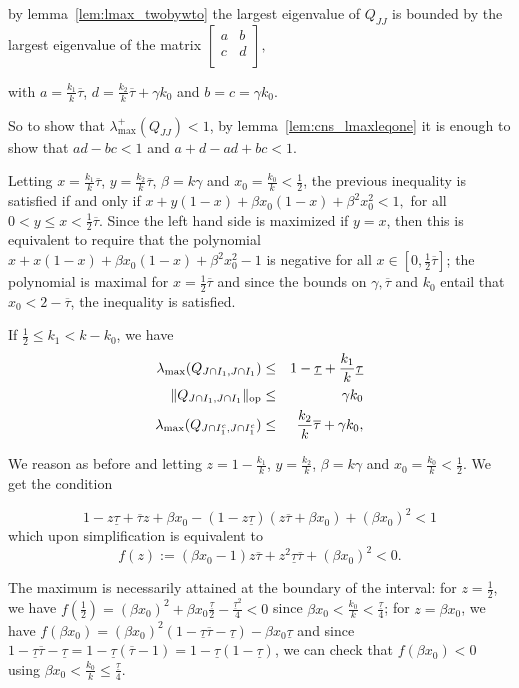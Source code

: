 \documentclass{article}
\def\op{{\rm op}}
\def\kmax{{k_1}}
\def\ksmax{{k_2}}
\def\tauu{{\overline{\tau}}}
\def\taul{{\underline{\tau}}}
\begin{document}
by lemma~\ref{lem:lmax_twobywto} the largest eigenvalue of $Q_{JJ}$ is bounded by the largest eigenvalue of the matrix
$\begin{bmatrix}
a & b\\
c & d \\
\end{bmatrix},
$

with $a=\frac{\kmax}{k} \tauu$, $d=\frac{\ksmax}{k}\tauu+\gamma k_0$ and $b=c=\gamma k_0$.

So to show that $\lambda_{\max}^+(Q_{JJ})<1$, by lemma~\ref{lem:cns_lmaxleqone} it is enough to show that 
$ad-bc<1$ and $a+d -ad+bc < 1$.
  
Letting $x=\frac{\kmax}{k} \tauu$, $y=\frac{\ksmax}{k}\tauu$, $\beta=k\gamma$ and $x_0=\frac{k_0}{k}<\frac{1}{2}$, the previous inequality is satisfied if and only if 
$x+y(1-x)+\beta x_0(1-x) +\beta^2 x_0^2 <1,$ for all $0<y\leq x <\frac{1}{2}\tauu$. Since the left hand side is maximized if $y=x$, then this is equivalent to require that the polynomial
$x+x(1-x)+\beta x_0(1-x) +\beta^2 x_0^2 -1$ is negative for all $x \in [0,\frac{1}{2}\tauu]$; the polynomial is maximal for $x=\frac{1}{2}\tauu$ and since the bounds on $\gamma, \tauu$ and $k_0$ entail that $x_0<2-\tauu$, the inequality is satisfied.

\item If $\frac{1}{2} \leq \kmax < k-k_0$, we have
\begin{eqnarray*}
\lambda_{\max}(Q_{J \cap I_1,J \cap I_1}) & \leq & 1-\taul +\frac{\kmax}{k} \taul\\
\|Q_{J \cap I_1,J \cap I_1}\|_{\op} & \leq & \gamma k_0 \\
\lambda_{\max}(Q_{J \cap I_1^c,J \cap I_1^c})  & \leq & \frac{\ksmax}{k}\tauu+\gamma k_0, 
\end{eqnarray*}

We reason as before and letting $z=1-\frac{\kmax}{k}$, $y=\frac{\ksmax}{k}$, $\beta=k\gamma$ and $x_0=\frac{k_0}{k}<\frac{1}{2}$.
We get the condition

$$1-z \taul+\tauu z+\beta x_0-(1-z \taul) (z\tauu+\beta x_0)+(\beta x_0)^2<1$$ which upon simplification is equivalent to $$f(z):=(\beta x_0-1)z \tauu + z^2 \taul\tauu+(\beta x_0)^2<0.$$ 

The maximum is necessarily attained at the boundary of the interval: for $z=\frac{1}{2}$, 
we have $f(\frac{1}{2})=(\beta x_0)^2+\beta x_0 \frac{\taul}{2}-\frac{\taul^2}{4}<0$ since 
$\beta x_0<\frac{k_0}{k}<\frac{\taul}{4}$; for  $z=\beta x_0$, we have $f(\beta x_0)=(\beta x_0)^2 (1-\taul\tauu-\taul)-\beta x_0 \taul$ and since $1-\taul\tauu-\taul=1-\taul(\tauu-1)=1-\taul(1-\taul)$, 
we can check that $f(\beta x_0)<0$ using $\beta x_0< \frac{k_0}{k} \leq \frac{\taul}{4}$.
\end{document}
